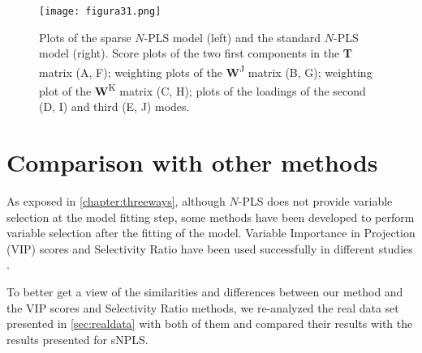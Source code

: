 \begin{figure}[hbtp]
	\centering
\texttt{[image: figura31.png]}
\caption{Plots of the sparse $N$-PLS model (left) and the standard $N$-PLS model (right). Score plots of the two first components in the \textbf{T} matrix (A, F); weighting plots of the \textbf{W}\textsuperscript{J} matrix (B, G); weighting plot of the \textbf{W}\textsuperscript{K} matrix (C, H); plots of the loadings of the second (D, I) and third (E, J) modes.}
\label{figura31}
\end{figure}

\section{Comparison with other methods}
As exposed in \autoref{chapter:threeways}, although $N$-PLS does not provide variable selection at the model fitting step, some methods have been developed to perform variable selection after the fitting of the model. Variable Importance in Projection (VIP) scores \parencite{favilla2013assessing} and Selectivity Ratio \parencite{rajalahti2009biomarker} have been used successfully in different studies \parencite{favilla2014ranking, mostafapour2015n, yun2016variable}.

To better get a view of the similarities and differences between our method and the VIP scores and Selectivity Ratio methods, we re-analyzed the real data set presented in \autoref{sec:realdata} with both of them and compared their results with the results presented for sNPLS.
